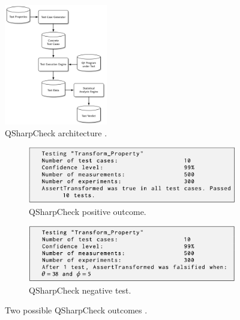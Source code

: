 \begin{itemize}
\begin{figure}[H]
        \centering
        \includegraphics[width=0.4\textwidth]{TFM/photos/QSharpOverview.png}
        \caption{QSharpCheck architecture \cite{honarvar2020property}.} 
        \label{Fig:QSharpArch}
\end{figure}

\begin{figure}[H]
    \centering
    \begin{subfigure}[H]{0.48\textwidth}
        \centering
        \includegraphics[width=\textwidth]{TFM/photos/QSharpOut1.png}
        \caption{QSharpCheck positive outcome.} 
        \label{Fig:QSharpOutput1}
    \end{subfigure}
    \hfill
    \begin{subfigure}[H]{0.48\textwidth}
        \centering
        \includegraphics[width=\textwidth]{TFM/photos/Qsharpout2.png}
        \caption{QSharpCheck negative test.} 
        \label{Fig:QSharpOutput2}
    \end{subfigure}
        \caption{Two possible QSharpCheck outcomes \cite{honarvar2020property}. }
    \label{FIG:QSharpOutput}
 \end{figure}


\end{itemize}
